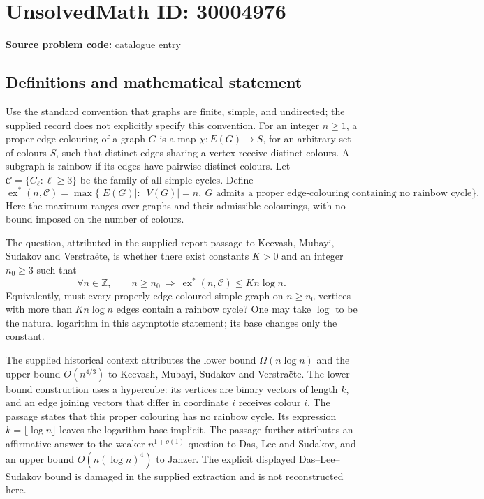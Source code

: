 \documentclass[11pt]{article}
\newcommand{\Z}{\mathbb{Z}}
\begin{document}
\section*{UnsolvedMath ID: 30004976}
\textbf{Source problem code:} catalogue entry
\subsection{Definitions and mathematical statement}
Use the standard convention that graphs are finite, simple, and undirected; the supplied record does not explicitly specify this convention. For an integer \(n\geq 1\), a proper edge-colouring of a graph \(G\) is a map \(\chi:E(G)\to S\), for an arbitrary set of colours \(S\), such that distinct edges sharing a vertex receive distinct colours. A subgraph is rainbow if its edges have pairwise distinct colours. Let \(\mathcal C=\{C_\ell:\ell\geq 3\}\) be the family of all simple cycles. Define
\[
\operatorname{ex}^{*}(n,\mathcal C)
=\max\bigl\{|E(G)|:\ |V(G)|=n,\ G\text{ admits a proper edge-colouring containing no rainbow cycle}\bigr\}.
\]
Here the maximum ranges over graphs and their admissible colourings, with no bound imposed on the number of colours.

The question, attributed in the supplied report passage to Keevash, Mubayi, Sudakov and Verstraëte, is whether there exist constants \(K>0\) and an integer \(n_0\geq 3\) such that
\[
\forall n\in\Z,\qquad n\geq n_0\ \Longrightarrow\ \operatorname{ex}^{*}(n,\mathcal C)\leq K n\log n.
\]
Equivalently, must every properly edge-coloured simple graph on \(n\geq n_0\) vertices with more than \(Kn\log n\) edges contain a rainbow cycle? One may take \(\log\) to be the natural logarithm in this asymptotic statement; its base changes only the constant.

The supplied historical context attributes the lower bound \(\Omega(n\log n)\) and the upper bound \(O(n^{4/3})\) to Keevash, Mubayi, Sudakov and Verstraëte. The lower-bound construction uses a hypercube: its vertices are binary vectors of length \(k\), and an edge joining vectors that differ in coordinate \(i\) receives colour \(i\). The passage states that this proper colouring has no rainbow cycle. Its expression \(k=\lfloor\log n\rfloor\) leaves the logarithm base implicit. The passage further attributes an affirmative answer to the weaker \(n^{1+o(1)}\) question to Das, Lee and Sudakov, and an upper bound \(O(n(\log n)^4)\) to Janzer. The explicit displayed Das--Lee--Sudakov bound is damaged in the supplied extraction and is not reconstructed here.
\end{document}
